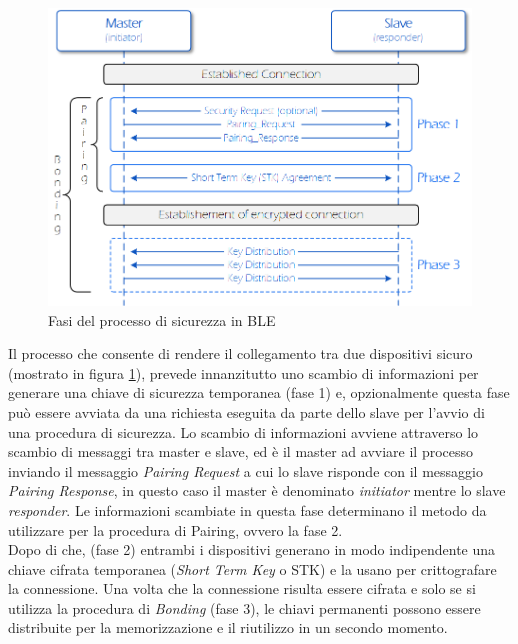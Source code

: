 \begin{figure}[!ht]
    \centering
    \includegraphics[width = \textwidth]{images/Pairing and Bonding.png}
    \caption{Fasi del processo di sicurezza in BLE}
    \label{fig:phasis_pairing_bonding}
\end{figure}

\noindent Il processo che consente di rendere il collegamento tra due dispositivi sicuro (mostrato in figura \ref{fig:phasis_pairing_bonding}), prevede innanzitutto uno scambio di informazioni per generare una chiave di sicurezza temporanea (fase 1) e, opzionalmente questa fase può essere avviata da una richiesta eseguita da parte dello slave per l'avvio di una procedura di sicurezza. Lo scambio di informazioni avviene attraverso lo scambio di messaggi tra master e slave, ed è il master ad avviare il processo inviando il messaggio \textit{Pairing Request} a cui lo slave risponde con il messaggio \textit{Pairing Response}, in questo caso il master è denominato \textit{initiator} mentre lo slave \textit{responder}. Le informazioni scambiate in questa fase determinano il metodo da utilizzare per la procedura di Pairing, ovvero la fase 2.\\
Dopo di che, (fase 2) entrambi i dispositivi generano in modo indipendente una chiave cifrata temporanea (\textit{Short Term Key} o STK) e la usano per crittografare la connessione. 
Una volta che la connessione risulta essere cifrata e solo se si utilizza la procedura di \textit{Bonding} (fase 3), le chiavi permanenti possono essere distribuite per la memorizzazione e il riutilizzo in un secondo momento. 

